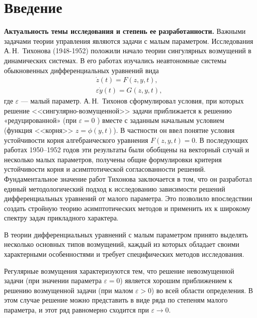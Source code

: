\documentclass[../main.tex]{subfiles}
\begin{document}
\clearpage
\section*{Введение}
\textbf{Актуальность темы исследования и степень ее разработанности.} 
Важными задачами теории управления являются задачи с малым параметром.  
Исследования А.\,Н.~Тихонова (1948-1952) \cite{Tihonov1948,Tihonov1952} положили начало теории сингулярных возмущений в динамических системах. 
В его работах изучались неавтономные системы обыкновенных дифференциальных уравнений вида
\begin{gather*}
	\dot{z}(t) = F(z,y, t), \\
	\varepsilon \dot{y}(t)  = G(z,y,t),
\end{gather*}
где $\varepsilon$ --- малый параметр. 
А.\,Н.~Тихонов сформулировал условия, при которых решение <<сингулярно-возмущенной>> задачи приближается к решению «редуцированной» (при $\varepsilon = 0$ ) вместе с заданным начальным условием (функция <<корня>> $z=\phi(y,t)$). 
В частности он ввел понятие условия устойчивости корня алгебраического уравнения $F(z,y,t)=0$. 
В последующих работах 1950–1952 годов эти результаты были обобщены на векторный случай и несколько малых параметров, получены общие формулировки критерия устойчивости корня и асимптотической согласованности решений. 
Фундаментальное значение работ Тихонова заключается в том, что он разработал единый методологический подход к исследованию зависимости решений дифференциальных уравнений от малого параметра. 
Это позволило впоследствии создать стройную теорию асимптотических методов и применить их к широкому спектру задач прикладного характера.

В теории дифференциальных уравнений с малым параметром принято выделять несколько основных типов возмущений, каждый из которых обладает своими характерными особенностями и требует специфических методов исследования. 

Регулярные возмущения характеризуются тем, что решение невозмущенной задачи (при значении параметра $\varepsilon = 0$) является хорошим приближением к решению возмущенной задачи (при малом $\varepsilon > 0$) во всей области определения. 
В этом случае решение можно представить в виде ряда по степеням малого параметра, и этот ряд равномерно сходится при $\varepsilon \to 0$.
\end{document}
